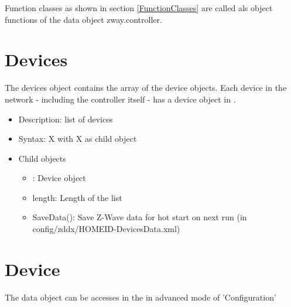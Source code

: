 Function classes as shown in section \ref{FunctionClasses} are called als object functions of the 
data object zway.controller.


\section{Devices}

The devices object contains the array of the device objects. Each device in the network - including the 
controller itself -  has a device object in \zway.

\begin {itemize}
\item Description: list of devices
\item Syntax:  X with  X as child object
\item Child objects
\begin {itemize}
\item [m]: Device object
\item length: Length of the list
\item SaveData(): Save \zway Z-Wave data for hot start on next run (in config/zddx/HOMEID-DevicesData.xml)
\end {itemize}
\end {itemize}
 

\section{Device}

The data object can be accesses in the \zweui in advanced mode of 'Configuration'

